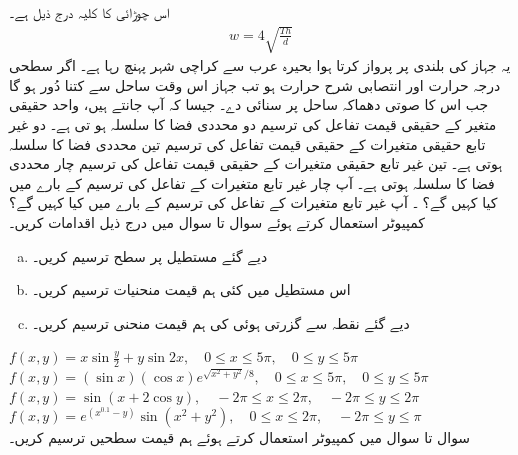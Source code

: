 اس چوڑائی کا  کلیہ درج ذیل ہے۔
\begin{align*}
w=4\sqrt{\tfrac{Th}{d}}
\end{align*}
یہ جہاز  کی بلندی پر پرواز کرتا ہوا  بحیرہ عرب  سے کراچی  شہر    پہنچ رہا ہے۔ اگر سطحی درجہ حرارت  اور انتصابی شرح حرارت  ہو تب   جہاز  اس وقت ساحل سے کتنا دُور ہو گا جب اس کا صوتی دھماکہ  ساحل پر سنائی دے۔
جیسا کہ آپ جانتے ہیں، واحد حقیقی متغیر کے حقیقی قیمت تفاعل کی ترسیم دو محددی فضا کا سلسلہ ہو تی ہے۔ دو غیر تابع حقیقی متغیرات کے حقیقی قیمت تفاعل  کی ترسیم تین محددی فضا کا سلسلہ ہوتی ہے۔    تین غیر تابع حقیقی متغیرات کے حقیقی قیمت تفاعل  کی ترسیم چار  محددی فضا کا سلسلہ ہوتی ہے۔   آپ چار غیر تابع متغیرات کے تفاعل   کی ترسیم کے بارے میں کیا کہیں گے؟ ۔   آپ   غیر تابع متغیرات کے تفاعل   کی ترسیم کے بارے میں کیا کہیں گے؟
\\
کمپیوٹر استعمال کرتے ہوئے سوال  تا سوال  میں درج ذیل اقدامات کریں۔
\begin{enumerate}[a.]
\item
دیے گئے مستطیل پر سطح ترسیم کریں۔
\item
اس مستطیل میں کئی ہم قیمت منحنیات ترسیم کریں۔
\item
دیے گئے نقطہ سے گزرتی  ہوئی    کی   ہم قیمت منحنی ترسیم کریں۔ 
\end{enumerate}

$f(x,y)=x\sin\tfrac{y}{2}+y\sin 2x,\quad 0\le x\le 5\pi,\quad 0\le y\le 5\pi$
$f(x,y)=(\sin x)(\cos x)e^{\sqrt{x^2+y^2}/8},\quad 0\le x\le 5\pi,\quad 0\le y\le 5\pi$
$f(x,y)=\sin(x+2\cos y),\quad -2\pi\le x\le 2\pi,\quad -2\pi\le y\le 2\pi$
$f(x,y)=e^{(x^{0.1}-y)}\sin (x^2+y^2),\quad 0\le x\le 2\pi,\quad -2\pi\le y\le \pi$
\\
سوال  تا سوال  میں کمپیوٹر استعمال کرتے ہوئے ہم قیمت سطحیں  ترسیم کریں۔

